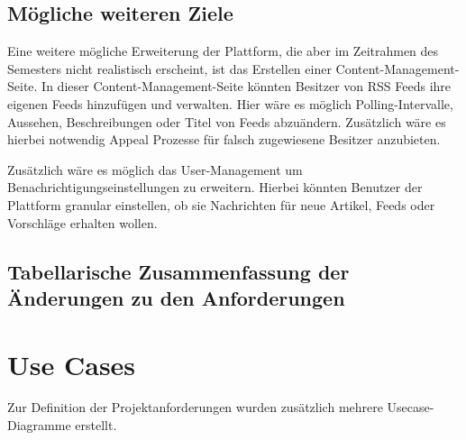 \subsection{Mögliche weiteren Ziele}
Eine weitere mögliche Erweiterung der Plattform, die aber im Zeitrahmen des Semesters nicht realistisch erscheint, ist das Erstellen einer Content-Management-Seite.
In dieser Content-Management-Seite könnten Besitzer von RSS Feeds ihre eigenen Feeds hinzufügen und verwalten.
Hier wäre es möglich Polling-Intervalle, Aussehen, Beschreibungen oder Titel von Feeds abzuändern.
Zusätzlich wäre es hierbei notwendig Appeal Prozesse für falsch zugewiesene Besitzer anzubieten.

Zusätzlich wäre es möglich das User-Management um Benachrichtigungseinstellungen zu erweitern. 
Hierbei könnten Benutzer der Plattform granular einstellen, ob sie Nachrichten für neue Artikel, Feeds oder Vorschläge erhalten wollen.

\subsection{Tabellarische Zusammenfassung der Änderungen zu den Anforderungen}
\begin{table}[h]
\end{table}

\section{Use Cases}
Zur Definition der Projektanforderungen wurden zusätzlich mehrere Usecase-Diagramme erstellt.

